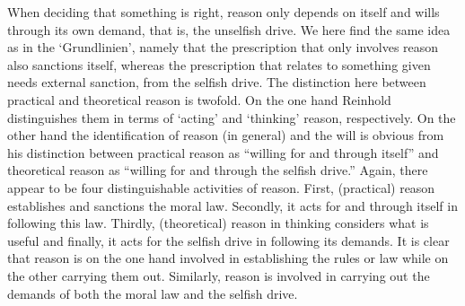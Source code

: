 When deciding that something is right, reason only depends on itself and wills through its own demand, that is, the unselfish drive. We here find the same idea as in the `Grundlinien', namely that the prescription that only involves reason also sanctions itself, whereas the prescription that relates to something given needs external sanction, from the selfish drive. The distinction here between practical and theoretical reason is twofold. On the one hand Reinhold distinguishes them in terms of `acting' and `thinking' reason, respectively. On the other hand the identification of reason (in general) and the will is obvious from his distinction between practical reason as ``willing for and through itself'' and theoretical reason as ``willing for and through the selfish drive.'' Again, there appear to be four distinguishable activities of reason. First, (practical) reason establishes and sanctions the moral law. Secondly, it acts for and through itself in following this law. Thirdly, (theoretical) reason in thinking considers what is useful and finally, it acts for the selfish drive in following its demands. It is clear that reason is on the one hand involved in establishing the rules or law while on the other carrying them out. Similarly, reason is involved in carrying out the demands of both the moral law and the selfish drive. 

